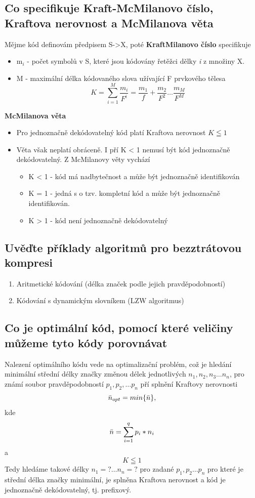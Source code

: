 \subsection{Co specifikuje Kraft-McMilanovo číslo, Kraftova nerovnost a McMilanova věta}
Mějme kód definovám předpisem S->X, poté \textbf{KraftMilanovo číslo} specifikuje
\begin{itemize}
    \item m$_i$ - počet symbolů v S, které jsou kódovány řetěžci dělky \emph{i} z množiny X.
    \item M - maximální délka kódovaného slova užívající F prvkového tělesa
    $$K = \sum_{i=1}^M \frac{m_i}{F^i}= \frac{m_1}{f} + \frac{m_2}{F^2} \dots \frac{m_M}{F^M}$$
\end{itemize}
\textbf{McMilanova věta}
\begin{itemize}
    \item Pro jednoznačně dekódovatelný kód platí Kraftova nerovnost $K \leqq 1$
    \item Věta však neplatí obráceně.
    I pří K < 1 nemusí být kód jednoznačně dekódovatelný.
    Z McMilanovy věty vychází
    \begin{itemize}
        \item K < 1 - kód má nadbytečnost a může být jednoznačně identifikován
        \item K = 1 - jedná s o tzv. kompletní kód a může být jednoznačně identifikován.
        \item K > 1 - kód není jednoznačně dekódovatelný
    \end{itemize}
\end{itemize}
\subsection{Uvěďte příklady algoritmů pro bezztrátovou kompresi}
\begin{enumerate}
    \item Aritmetické kódování (délka značek podle jejich pravděpodobností)
    \item Kódování s dynamickým slovníkem (LZW algoritmus)
\end{enumerate}

\subsection{Co je optimální kód, pomocí které veličiny můžeme tyto kódy porovnávat}
Nalezení optimálního kódu vede  na optimalizační problém, což je hledání minimální střední délky značky změnou délek jednotlivých $n_1, n_2, n_3 \dots n_n$, pro známí soubor pravděpodobností $p_1, p_2, \dots p_n$ pří splnění Kraftovy nerovnosti
$$\Bar{n}_{opt} = min \{\Bar{n}\},$$ kde
$$\Bar{n}=\sum_{i=1}^q p_i*n_i$$ a 
$$K\leqq1$$
Tedy hledáme takové délky $n_1=? \dots n_n=?$ pro zadané $p_1,p_2\dots p_n$ pro které je střední délka značky minimální, je splněna Kraftova nerovnost a kód je jednoznačně dekódovatelný, tj. prefixový.

